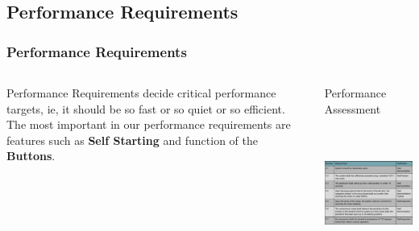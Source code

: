 \documentclass[aspectratio=169]{beamer}
\begin{document}
\subsection{Performance Requirements}
\begin{frame}
    \frametitle{Performance Requirements}

    \begin{columns}
        \begin{column}{0.48\textwidth}
            Performance Requirements decide critical performance targets, ie, it should be so
            fast or so quiet or so efficient. The most important in our performance requirements
            are features such as \textbf{Self Starting} and function of the \textbf{Buttons}.
        \end{column}

        \begin{column}{0.48\textwidth}
            \begin{block}{Performance Assessment}
                \includegraphics[height=5cm]{PerformanceRequirement}
            \end{block}
        \end{column}
    \end{columns}


\end{frame}
\end{document}
